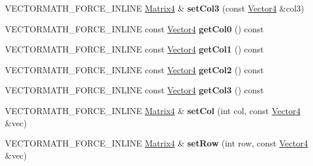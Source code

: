 \begin{DoxyCompactItemize}
\item 
\mbox{\label{classVectormath_1_1Aos_1_1Matrix4_af6cedd35b65c870084130f9c5dd9d66a}} 
V\+E\+C\+T\+O\+R\+M\+A\+T\+H\+\_\+\+F\+O\+R\+C\+E\+\_\+\+I\+N\+L\+I\+NE \hyperlink{classVectormath_1_1Aos_1_1Matrix4}{Matrix4} \& {\bfseries set\+Col3} (const \hyperlink{classVectormath_1_1Aos_1_1Vector4}{Vector4} \&col3)
\item 
\mbox{\label{classVectormath_1_1Aos_1_1Matrix4_ad5718a25b55228413472c08d33ecb7fb}} 
V\+E\+C\+T\+O\+R\+M\+A\+T\+H\+\_\+\+F\+O\+R\+C\+E\+\_\+\+I\+N\+L\+I\+NE const \hyperlink{classVectormath_1_1Aos_1_1Vector4}{Vector4} {\bfseries get\+Col0} () const
\item 
\mbox{\label{classVectormath_1_1Aos_1_1Matrix4_aa893eed538f9e0bf483f0158aeaafb2d}} 
V\+E\+C\+T\+O\+R\+M\+A\+T\+H\+\_\+\+F\+O\+R\+C\+E\+\_\+\+I\+N\+L\+I\+NE const \hyperlink{classVectormath_1_1Aos_1_1Vector4}{Vector4} {\bfseries get\+Col1} () const
\item 
\mbox{\label{classVectormath_1_1Aos_1_1Matrix4_aa40ce171cc789465fd61989ffdb0e6e5}} 
V\+E\+C\+T\+O\+R\+M\+A\+T\+H\+\_\+\+F\+O\+R\+C\+E\+\_\+\+I\+N\+L\+I\+NE const \hyperlink{classVectormath_1_1Aos_1_1Vector4}{Vector4} {\bfseries get\+Col2} () const
\item 
\mbox{\label{classVectormath_1_1Aos_1_1Matrix4_a9774fd4f17576a0a3eb38a2716eacd63}} 
V\+E\+C\+T\+O\+R\+M\+A\+T\+H\+\_\+\+F\+O\+R\+C\+E\+\_\+\+I\+N\+L\+I\+NE const \hyperlink{classVectormath_1_1Aos_1_1Vector4}{Vector4} {\bfseries get\+Col3} () const
\item 
\mbox{\label{classVectormath_1_1Aos_1_1Matrix4_a1cc572f1afe0abba620ed52463f85846}} 
V\+E\+C\+T\+O\+R\+M\+A\+T\+H\+\_\+\+F\+O\+R\+C\+E\+\_\+\+I\+N\+L\+I\+NE \hyperlink{classVectormath_1_1Aos_1_1Matrix4}{Matrix4} \& {\bfseries set\+Col} (int col, const \hyperlink{classVectormath_1_1Aos_1_1Vector4}{Vector4} \&vec)
\item 
\mbox{\label{classVectormath_1_1Aos_1_1Matrix4_aa973863bc1d06a93d9cdbf8f17a504ec}} 
V\+E\+C\+T\+O\+R\+M\+A\+T\+H\+\_\+\+F\+O\+R\+C\+E\+\_\+\+I\+N\+L\+I\+NE \hyperlink{classVectormath_1_1Aos_1_1Matrix4}{Matrix4} \& {\bfseries set\+Row} (int row, const \hyperlink{classVectormath_1_1Aos_1_1Vector4}{Vector4} \&vec)

\end{DoxyCompactItemize}
